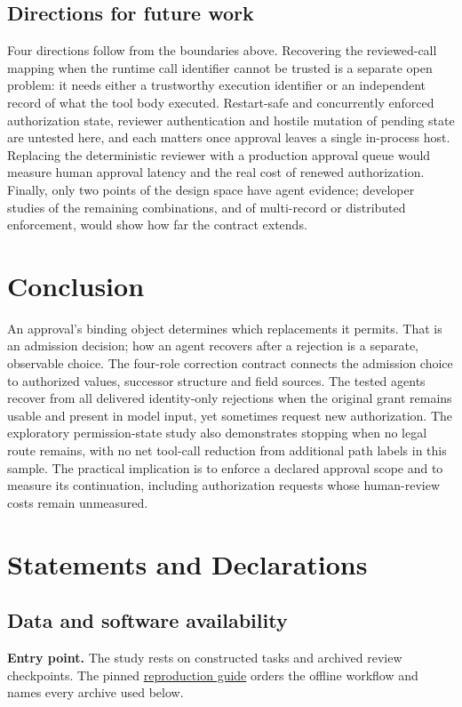\documentclass[pdflatex,sn-basic]{sn-jnl}
\begin{document}
\subsection{Directions for future work}\label{future-work}

Four directions follow from the boundaries above. Recovering the reviewed-call mapping when the runtime call identifier cannot be trusted is a separate open problem: it needs either a trustworthy execution identifier or an independent record of what the tool body executed. Restart-safe and concurrently enforced authorization state, reviewer authentication and hostile mutation of pending state are untested here, and each matters once approval leaves a single in-process host. Replacing the deterministic reviewer with a production approval queue would measure human approval latency and the real cost of renewed authorization. Finally, only two points of the design space have agent evidence; developer studies of the remaining combinations, and of multi-record or distributed enforcement, would show how far the contract extends.

\section{Conclusion}\label{conclusion}

An approval's binding object determines which replacements it permits. That is an admission decision; how an agent recovers after a rejection is a separate, observable choice. The four-role correction contract connects the admission choice to authorized values, successor structure and field sources. The tested agents recover from all delivered identity-only rejections when the original grant remains usable and present in model input, yet sometimes request new authorization. The exploratory permission-state study also demonstrates stopping when no legal route remains, with no net tool-call reduction from additional path labels in this sample. The practical implication is to enforce a declared approval scope and to measure its continuation, including authorization requests whose human-review costs remain unmeasured.
\section*{Statements and Declarations}
\subsection*{Data and software availability}
\textbf{Entry point.} The study rests on constructed tasks and archived review checkpoints. The pinned \href{https://github.com/lhh666-6/auto-dete/blob/f5fe7231c5e808ba1629132d222f448bff471204/REPRODUCIBILITY.md}{reproduction guide} orders the offline workflow and names every archive used below.
\end{document}
